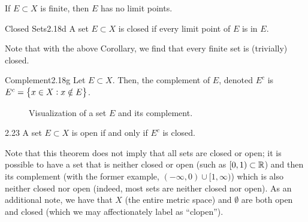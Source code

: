 \begin{ncorollary}{}{}
    If $E \subset X$ is finite, then $E$ has no limit points.
\end{ncorollary}

\setcounter{rudin}{17}
\begin{definition}{Closed Sets}{2.18d}
    A set $E \subset X$ is closed if every limit point of $E$ is in $E$. 
\end{definition}
\noindent Note that with the above Corollary, we find that every finite set is (trivially) closed.

\setcounter{rudin}{17}
\begin{definition}{Complement}{2.18g}
    Let $E \subset X$. Then, the complement of $E$, denoted $E^c$ is $E^c = \set{x \in X: x \notin E}$. 
\end{definition}
\begin{figure}[htbp]
    \centering
    
    \caption{Visualization of a set $E$ and its complement.}
    \label{fig8}
\end{figure}

\setcounter{rudin}{22}
\begin{theorem}{}{2.23}
    A set $E \subset X$ is open if and only if $E^c$ is closed.
\end{theorem}
\noindent Note that this theorem does not imply that all sets are closed or open; it is possible to have a set that is neither closed or open (such as $[0, 1) \subset \mathbb{R}$) and then its complement (with the former example, $(-\infty, 0) \cup [1, \infty)$) which is also neither closed nor open (indeed, most sets are neither closed nor open). As an additional note, we have that $X$ (the entire metric space) and $\emptyset$ are both open and closed (which we may affectionately label as ``clopen'').

